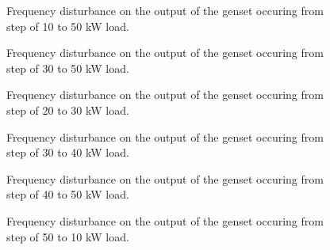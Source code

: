 \begin{figure}[H]
\centering

\caption{Frequency disturbance on the output of the genset occuring from step of 10 to 50 kW load.}
\label{fig:test8-9-10to50kwstepfreq}
\end{figure}

\begin{figure}[H]
\centering

\caption{Frequency disturbance on the output of the genset occuring from step of 30 to 50 kW load.}
\label{fig:test9-30to50kwstepfreq}
\end{figure}

\begin{figure}[H]
\centering

\caption{Frequency disturbance on the output of the genset occuring from step of 20 to 30 kW load.}
\label{fig:test8-9-20to30kwstepfreq}
\end{figure}

\begin{figure}[H]
\centering

\caption{Frequency disturbance on the output of the genset occuring from step of 30 to 40 kW load.}
\label{fig:test8-9-30to40kwstepfreq}
\end{figure}

\begin{figure}[H]
\centering

\caption{Frequency disturbance on the output of the genset occuring from step of 40 to 50 kW load.}
\label{fig:test8-9-40to50kwstepfreq}
\end{figure}

\begin{figure}[H]
\centering

\caption{Frequency disturbance on the output of the genset occuring from step of 50 to 10 kW load.}
\label{fig:test8-9-50to10kwstepfreq}
\end{figure}

% 


